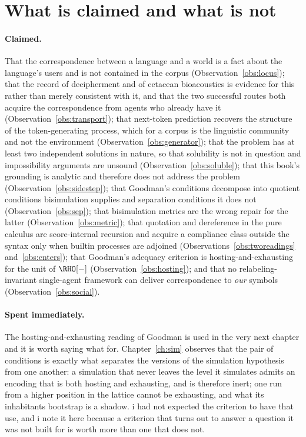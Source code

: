 \section{What is claimed and what is not}
\label{sec:notation-claims}

\paragraph{Claimed.}
That the correspondence between a language and a world is a fact
about the language's users and is not contained in the corpus
(Observation~\ref{obs:locus}); that the record of decipherment and
of cetacean bioacoustics is evidence for this rather than merely
consistent with it, and that the two successful routes both acquire
the correspondence from agents who already have it
(Observation~\ref{obs:transport}); that next-token prediction
recovers the structure of the token-generating process, which for a
corpus is the linguistic community and not the environment
(Observation~\ref{obs:generator}); that the problem has at least
two independent solutions in nature, so that solubility is not in
question and impossibility arguments are unsound
(Observation~\ref{obs:soluble}); that this book's grounding is
analytic and therefore does not address the problem
(Observation~\ref{obs:sidestep}); that Goodman's conditions
decompose into quotient conditions bisimulation supplies and
separation conditions it does not (Observation~\ref{obs:sep}); that
bisimulation metrics are the wrong repair for the latter
(Observation~\ref{obs:metric}); that quotation and dereference in
the pure calculus are score-internal recursion and acquire a
compliance class outside the syntax only when builtin processes are
adjoined (Observations~\ref{obs:tworeadings}
and~\ref{obs:enters}); that Goodman's adequacy criterion is
hosting-and-exhausting for the unit of $\RHO[-]$
(Observation~\ref{obs:hosting}); and that no relabeling-invariant
single-agent framework can deliver correspondence to \emph{our}
symbols (Observation~\ref{obs:social}).

\paragraph{Spent immediately.}
The hosting-and-exhausting reading of Goodman is used in the very next
chapter and it is worth saying what for.
Chapter~\ref{ch:sim} observes that the pair of conditions is exactly what
separates the versions of the simulation hypothesis from one another:
a simulation that never leaves the level it simulates admits an encoding
that is both hosting and exhausting, and is therefore inert; one run from
a higher position in the lattice cannot be exhausting, and what its
inhabitants bootstrap is a shadow.
i had not expected the criterion to have that use, and i note it here
because a criterion that turns out to answer a question it was not built
for is worth more than one that does not.

